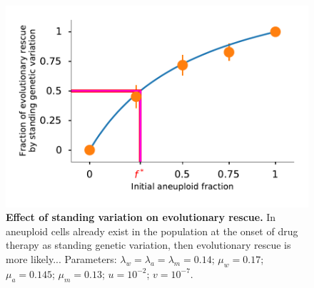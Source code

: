 \documentclass[12pt]{extarticle}
\begin{document}

\begin{figure}
 \vspace*{1\baselineskip}
\includegraphics[width=1\textwidth]{Figures/FractionPlot.pdf}
\caption{\textbf{Effect of standing variation on evolutionary rescue.}
In aneuploid cells already exist in the population at the onset of drug therapy as standing genetic variation, then evolutionary rescue is more likely... 
Parameters: $\lambda_w=\lambda_a=\lambda_m=0.14$; $\mu_w=0.17$; $\mu_a=0.145$; $\mu_m=0.13$; $u=10^{-2}$; $v=10^{-7}$.
}
\label{FractionPlot}
\end{figure}

\end{document}
